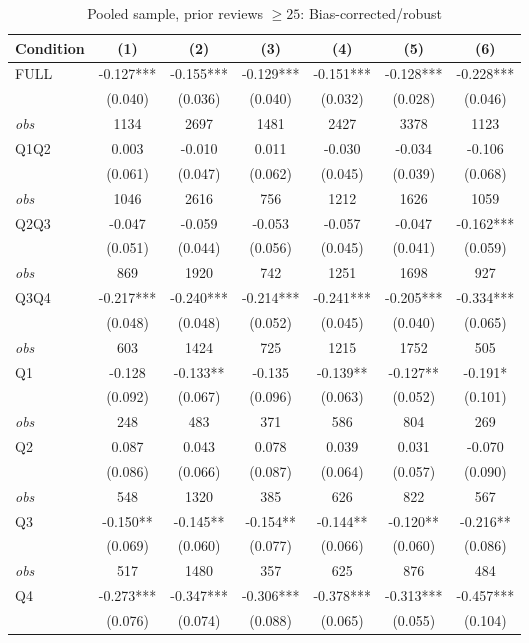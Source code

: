 \begin{table}[!htbp]
\centering
\caption{Pooled sample, prior reviews $\geq25$: Bias-corrected/robust}
\begin{tabular}{lcccccc}
\toprule
Condition & (1) & (2) & (3) & (4) & (5) & (6) \\
\midrule
FULL & -0.127*** & -0.155*** & -0.129*** & -0.151*** & -0.128*** & -0.228*** \\
 & (0.040) & (0.036) & (0.040) & (0.032) & (0.028) & (0.046) \\
\textit{obs} & 1134 & 2697 & 1481 & 2427 & 3378 & 1123 \\
Q1Q2 & 0.003 & -0.010 & 0.011 & -0.030 & -0.034 & -0.106 \\
 & (0.061) & (0.047) & (0.062) & (0.045) & (0.039) & (0.068) \\
\textit{obs} & 1046 & 2616 & 756 & 1212 & 1626 & 1059 \\
Q2Q3 & -0.047 & -0.059 & -0.053 & -0.057 & -0.047 & -0.162*** \\
 & (0.051) & (0.044) & (0.056) & (0.045) & (0.041) & (0.059) \\
\textit{obs} & 869 & 1920 & 742 & 1251 & 1698 & 927 \\
Q3Q4 & -0.217*** & -0.240*** & -0.214*** & -0.241*** & -0.205*** & -0.334*** \\
 & (0.048) & (0.048) & (0.052) & (0.045) & (0.040) & (0.065) \\
\textit{obs} & 603 & 1424 & 725 & 1215 & 1752 & 505 \\
Q1 & -0.128 & -0.133** & -0.135 & -0.139** & -0.127** & -0.191* \\
 & (0.092) & (0.067) & (0.096) & (0.063) & (0.052) & (0.101) \\
\textit{obs} & 248 & 483 & 371 & 586 & 804 & 269 \\
Q2 & 0.087 & 0.043 & 0.078 & 0.039 & 0.031 & -0.070 \\
 & (0.086) & (0.066) & (0.087) & (0.064) & (0.057) & (0.090) \\
\textit{obs} & 548 & 1320 & 385 & 626 & 822 & 567 \\
Q3 & -0.150** & -0.145** & -0.154** & -0.144** & -0.120** & -0.216** \\
 & (0.069) & (0.060) & (0.077) & (0.066) & (0.060) & (0.086) \\
\textit{obs} & 517 & 1480 & 357 & 625 & 876 & 484 \\
Q4 & -0.273*** & -0.347*** & -0.306*** & -0.378*** & -0.313*** & -0.457*** \\
 & (0.076) & (0.074) & (0.088) & (0.065) & (0.055) & (0.104) \\

\end{tabular}
\end{table}
